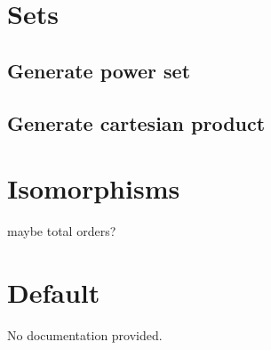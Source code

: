 \documentclass{article}
\begin{document}
\section{Sets}
\subsection{Generate power set}
\subsection{Generate cartesian product}

\section{Isomorphisms}
maybe total orders?

\section{Default}
No documentation provided.
\end{document}
